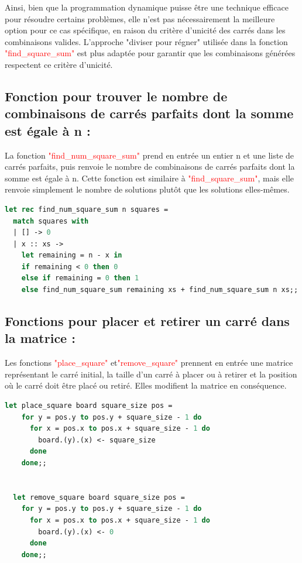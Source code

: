 \documentclass{article}
\begin{document}
Ainsi, bien que la programmation dynamique puisse être une technique efficace pour résoudre certains problèmes, elle n'est pas nécessairement la meilleure option pour ce cas spécifique, en raison du critère d'unicité des carrés dans les combinaisons valides. L'approche "diviser pour régner" utilisée dans la fonction \textcolor{red}{"find\_square\_sum"} est plus adaptée pour garantir que les combinaisons générées respectent ce critère d'unicité.\newline


\subsection{ Fonction pour trouver le nombre de combinaisons de carrés parfaits dont la somme est égale à n :}

La fonction \textcolor{red}{"find\_num\_square\_sum"} prend en entrée un entier n et une liste de carrés parfaits, puis renvoie le nombre de combinaisons de carrés parfaits dont la somme est égale à n. Cette fonction est similaire à \textcolor{red}{"find\_square\_sum"}, mais elle renvoie simplement le nombre de solutions plutôt que les solutions elles-mêmes.\newline
\begin{lstlisting}[language=Caml]
let rec find_num_square_sum n squares =
  match squares with
  | [] -> 0
  | x :: xs ->
    let remaining = n - x in
    if remaining < 0 then 0
    else if remaining = 0 then 1
    else find_num_square_sum remaining xs + find_num_square_sum n xs;;
\end{lstlisting}

\subsection{ Fonctions pour placer et retirer un carré dans la matrice :}
Les fonctions \textcolor{red}{"place\_square"} et\textcolor{red}{"remove\_square"} prennent en entrée une matrice représentant le carré initial, la taille d'un carré à placer ou à retirer et la position où le carré doit être placé ou retiré. Elles modifient la matrice en conséquence.\newline

\begin{lstlisting}[language=Caml]
let place_square board square_size pos =
    for y = pos.y to pos.y + square_size - 1 do
      for x = pos.x to pos.x + square_size - 1 do
        board.(y).(x) <- square_size
      done
    done;;


  let remove_square board square_size pos =
    for y = pos.y to pos.y + square_size - 1 do
      for x = pos.x to pos.x + square_size - 1 do
        board.(y).(x) <- 0
      done
    done;;
\end{lstlisting}
\end{document}
